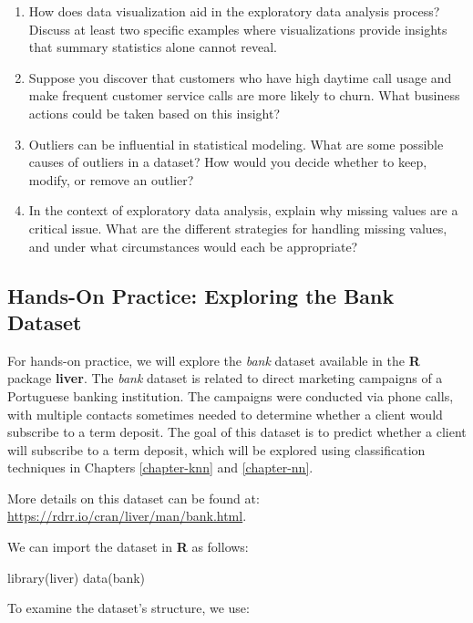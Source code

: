 \documentclass[
  11pt,
]{book}
\makeatletter
\newenvironment{Shaded}{}{}
\newcommand{\FunctionTok}[1]{#1}
\newcommand{\NormalTok}[1]{#1}
\newenvironment{kframe}{%
\medskip{}
\setlength{\fboxsep}{.8em}
 \def\at@end@of@kframe{}%
 \ifinner\ifhmode%
  \def\at@end@of@kframe{\end{minipage}}%
  \begin{minipage}{\columnwidth}%
 \fi\fi%
 \def\FrameCommand##1{\hskip\@totalleftmargin \hskip-\fboxsep
 \colorbox{shadecolor}{##1}\hskip-\fboxsep
     \hskip-\linewidth \hskip-\@totalleftmargin \hskip\columnwidth}%
 \MakeFramed {\advance\hsize-\width
   \@totalleftmargin\z@ \linewidth\hsize
   \@setminipage}}%
 {\par\unskip\endMakeFramed%
 \at@end@of@kframe}
\renewenvironment{Shaded}{\begin{kframe}}{\end{kframe}}
\theoremstyle{definition}
\theoremstyle{definition}
\theoremstyle{definition}
\theoremstyle{definition}
\theoremstyle{remark}
\makeatother
\begin{document}
\begin{enumerate}
\item
  How does data visualization aid in the exploratory data analysis process? Discuss at least two specific examples where visualizations provide insights that summary statistics alone cannot reveal.
\item
  Suppose you discover that customers who have high daytime call usage and make frequent customer service calls are more likely to churn. What business actions could be taken based on this insight?
\item
  Outliers can be influential in statistical modeling. What are some possible causes of outliers in a dataset? How would you decide whether to keep, modify, or remove an outlier?
\item
  In the context of exploratory data analysis, explain why missing values are a critical issue. What are the different strategies for handling missing values, and under what circumstances would each be appropriate?
\end{enumerate}

\subsection*{Hands-On Practice: Exploring the Bank Dataset}\label{hands-on-practice-exploring-the-bank-dataset}


For hands-on practice, we will explore the \emph{bank} dataset available in the \textbf{R} package \textbf{liver}. The \emph{bank} dataset is related to direct marketing campaigns of a Portuguese banking institution. The campaigns were conducted via phone calls, with multiple contacts sometimes needed to determine whether a client would subscribe to a term deposit. The goal of this dataset is to predict whether a client will subscribe to a term deposit, which will be explored using classification techniques in Chapters \ref{chapter-knn} and \ref{chapter-nn}.

More details on this dataset can be found at: \url{https://rdrr.io/cran/liver/man/bank.html}.

We can import the dataset in \textbf{R} as follows:

\begin{Shaded}
\begin{Highlighting}[]
\FunctionTok{library}\NormalTok{(liver)}
\FunctionTok{data}\NormalTok{(bank)      }
\end{Highlighting}
\end{Shaded}

To examine the dataset's structure, we use:
\end{document}
